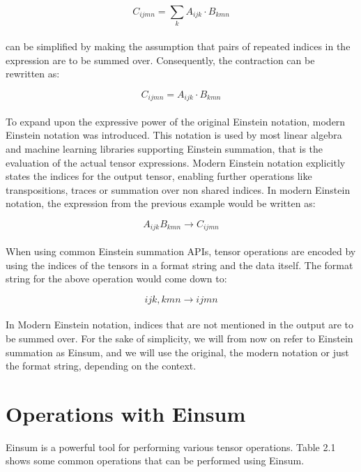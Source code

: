 \[C_{ijmn} = \sum_{k}A_{ijk} \cdot B_{kmn}\]
\noindent
\\
can be simplified by making the assumption that pairs of repeated indices in the expression
are to be summed over. Consequently, the contraction can be rewritten as:

\[C_{ijmn} = A_{ijk} \cdot B_{kmn}\]
\noindent
\\
To expand upon the expressive power of the original Einstein notation, modern Einstein
notation was introduced. This notation is used by most linear algebra and machine
learning libraries supporting Einstein summation, that is the evaluation of the actual
tensor expressions. Modern Einstein notation explicitly states the indices for the
output tensor, enabling further operations like transpositions, traces or summation
over non shared indices. In modern Einstein notation, the expression from the previous
example would be written as:

\[A_{ijk}B_{kmn} \rightarrow C_{ijmn}\]
\noindent
\\
When using common Einstein summation APIs, tensor operations are encoded by using the
indices of the tensors in a format string and the data itself.
\newpage
\noindent
The format string for the above operation would come down to:

\[ijk,kmn \rightarrow ijmn\]
\noindent
\\
In Modern Einstein notation, indices that are not mentioned in the output are to be
summed over. For the sake of simplicity, we will from now on refer to Einstein summation
as Einsum, and we will use the original, the modern notation or just the format
string, depending on the context.

\section{Operations with Einsum}
Einsum is a powerful tool for performing various tensor operations. Table 2.1 shows 
some common operations that can be performed using Einsum.

